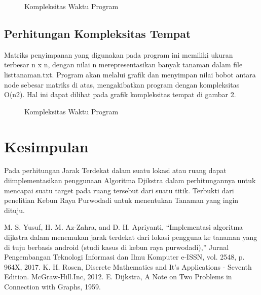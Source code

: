 \documentclass[conference]{IEEEtran}
\begin{document}
\begin{figure}[htbp]
    \centering
    \scalebox{0.25}{}
    \caption{Kompleksitas Waktu Program}        
\end{figure}

\subsection{Perhitungan Kompleksitas Tempat}
Matriks penyimpanan yang digunakan pada program ini
memiliki ukuran terbesar n x n, dengan nilai n merepresentasikan
banyak tanaman dalam file listtanaman.txt. Program
akan melalui grafik dan menyimpan nilai bobot antara node
sebesar matriks di atas, mengakibatkan program dengan kompleksitas
O(n2). Hal ini dapat dilihat pada grafik kompleksitas
tempat di gambar 2.

\begin{figure}[htbp]
    \centering
    \scalebox{0.25}{}
    \caption{Kompleksitas Waktu Program}        
\end{figure}

\section{Kesimpulan}
Pada perhitungan Jarak Terdekat dalam suatu lokasi atau ruang
dapat diimplementasikan penggunaan Algoritma Djikstra
dalam perhitungannya untuk mencapai suatu target pada ruang
tersebut dari suatu titik. Terbukti dari penelitian Kebun Raya
Purwodadi untuk menentukan Tanaman yang ingin dituju.

\begin{thebibliography}{00}
     M. S. Yusuf, H. M. Az-Zahra, and D. H. Apriyanti, “Implementasi
    algoritma dijkstra dalam menemukan jarak terdekat dari lokasi pengguna
    ke tanaman yang di tuju berbasis android (studi kasus di kebun raya purwodadi),”
    Jurnal Pengembangan Teknologi Informasi dan Ilmu Komputer
    e-ISSN, vol. 2548, p. 964X, 2017.
     K. H. Rosen, Discrete Mathematics and It’s Applications - Seventh
    Edition. McGraw-Hill.Inc, 2012.
     E. Dijkstra, A Note on Two Problems in Connection with Graphs, 1959.
    \end{thebibliography}
\end{document}
